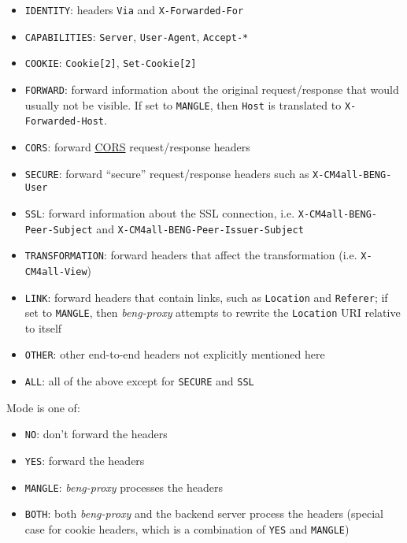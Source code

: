 \documentclass[a4paper,12pt]{article}
\begin{document}
\begin{itemize}
\item \texttt{IDENTITY}: headers \texttt{Via} and
  \texttt{X-Forwarded-For}
\item \texttt{CAPABILITIES}: \texttt{Server}, \texttt{User-Agent},
  \texttt{Accept-*}
\item \texttt{COOKIE}: \texttt{Cookie[2]}, \texttt{Set-Cookie[2]}

\item \texttt{FORWARD}: forward information about the original
  request/response that would usually not be visible.  If set to
  \verb|MANGLE|, then \texttt{Host} is translated to
  \texttt{X-Forwarded-Host}.

\item \texttt{CORS}: forward
  \href{http://www.w3.org/TR/cors/#syntax}{CORS} request/response
  headers

\item \texttt{SECURE}: forward ``secure'' request/response headers
  such as \texttt{X-CM4all-BENG-User}

\item \texttt{SSL}: forward information about the SSL connection,
  i.e. \verb|X-CM4all-BENG-Peer-Subject| and
  \verb|X-CM4all-BENG-Peer-Issuer-Subject|

\item \texttt{TRANSFORMATION}: forward headers that affect the
  transformation (i.e. \texttt{X-CM4all-View})

\item \texttt{LINK}: forward headers that contain links, such as
  \texttt{Location} and \texttt{Referer}; if set to \verb|MANGLE|,
  then \emph{beng-proxy} attempts to rewrite the \texttt{Location} URI
  relative to itself

\item \texttt{OTHER}: other end-to-end headers not explicitly
  mentioned here

\item \texttt{ALL}: all of the above except for \texttt{SECURE} and
  \texttt{SSL}

\end{itemize}

Mode is one of:

\begin{itemize}
\item \texttt{NO}: don't forward the headers
\item \texttt{YES}: forward the headers
\item \texttt{MANGLE}: \emph{beng-proxy} processes the headers
\item \texttt{BOTH}: both \emph{beng-proxy} and the backend server
  process the headers (special case for cookie headers, which is a
  combination of \texttt{YES} and \texttt{MANGLE})
\end{itemize}
\end{document}
